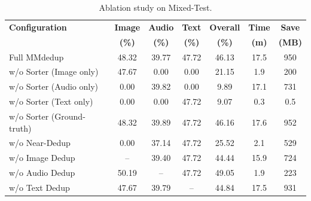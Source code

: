 \documentclass[sigconf, nonacm]{acmart}
\renewcommand{\arraystretch}{1.15}
\begin{document}
\begin{table}[t]
\caption{Ablation study on Mixed-Test.}
\vspace{-2mm}
\label{tab:ablation}
\centering
\footnotesize
\renewcommand{\arraystretch}{1.2}
\setlength{\tabcolsep}{4pt}
\begin{tabular}{p{2.55cm}cccccc}
\toprule
\textbf{Configuration} & \textbf{Image} & \textbf{Audio} & \textbf{Text} & \textbf{Overall} & \textbf{Time} & \textbf{Save} \\
 & \textbf{(\%)} & \textbf{(\%)} & \textbf{(\%)} & \textbf{(\%)} & \textbf{(m)} & \textbf{(MB)} \\
\midrule
Full MMdedup & 48.32 & 39.77 & 47.72 & 46.13 & 17.5 & 950 \\
w/o Sorter (Image only) & 47.67 & 0.00 & 0.00 & 21.15 & 1.9 & 200 \\
w/o Sorter (Audio only) & 0.00 & 39.82 & 0.00 & 9.89 & 17.1 & 731 \\
w/o Sorter (Text only) & 0.00 & 0.00 & 47.72 & 9.07 & 0.3 & 0.5 \\
w/o Sorter (Ground-truth) & 48.32 & 39.89 & 47.72 & 46.16 & 17.6 & 952 \\
w/o Near-Dedup & 0.00 & 37.14 & 47.72 & 25.52 & 2.1 & 529 \\
w/o Image Dedup & -- & 39.40 & 47.72 & 44.44 & 15.9 & 724 \\
w/o Audio Dedup & 50.19 & -- & 47.72 & 49.05 & 1.9 & 223 \\
w/o Text Dedup & 47.67 & 39.79 & -- & 44.84 & 17.5 & 931 \\
\bottomrule
\end{tabular}
\vspace{-3mm}
\end{table}
\end{document}

